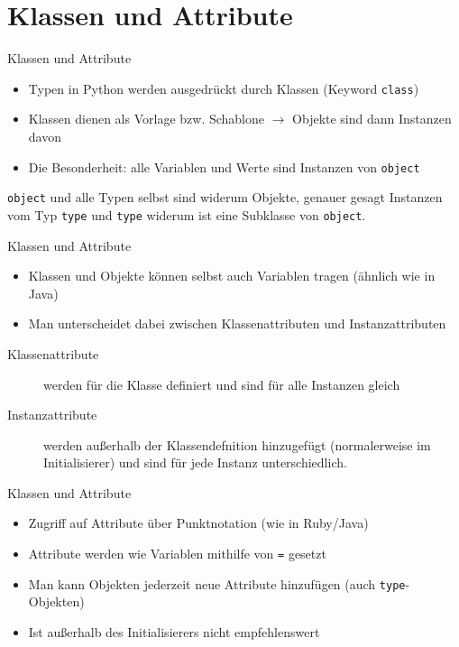 \section{Klassen und Attribute}
\begin{frame}[fragile]{Klassen und Attribute}
	\begin{itemize}
		\item Typen in Python werden ausgedrückt durch Klassen (Keyword \alert{\texttt{class}})
		\item Klassen dienen als Vorlage bzw. Schablone $\rightarrow$ Objekte sind dann Instanzen davon
		\item Die Besonderheit: alle Variablen und Werte sind Instanzen von \texttt{object}
	\end{itemize}
	\texttt{object} und alle Typen selbst sind widerum Objekte, genauer gesagt Instanzen vom Typ \texttt{type} und \texttt{type} widerum ist eine Subklasse von \texttt{object}.
\end{frame}

\begin{frame}[fragile]{Klassen und Attribute}
	\begin{itemize}
		\item Klassen und Objekte können selbst auch Variablen tragen (ähnlich wie in Java)
		\item Man unterscheidet dabei zwischen Klassenattributen und Instanzattributen
	\end{itemize}

	\begin{description}
		\item[Klassenattribute] werden für die Klasse definiert und sind für alle Instanzen gleich
		\item[Instanzattribute] werden außerhalb der Klassendefnition hinzugefügt (normalerweise im Initialisierer) und sind für jede Instanz unterschiedlich.
	\end{description}
\end{frame}

\begin{frame}[fragile]{Klassen und Attribute}
	\begin{itemize}
		\item Zugriff auf Attribute über Punktnotation (wie in Ruby/Java)
		\item Attribute werden wie Variablen mithilfe von \alert{\texttt{=}} gesetzt
		\item Man kann Objekten jederzeit neue Attribute hinzufügen (auch \texttt{type}-Objekten)
		\item Ist außerhalb des Initialisierers nicht empfehlenswert
	\end{itemize}
\end{frame}


